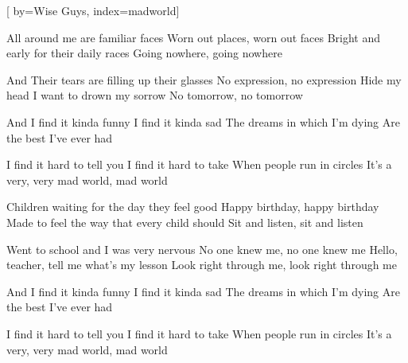 
[%
    by={Wise Guys},
    index={madworld}]


    \label{madworld}

    \beginverse
        All around me are familiar faces
        Worn out places, worn out faces
        Bright and early for their daily races
        Going nowhere, going nowhere

        And Their tears are filling up their glasses
        No expression, no expression
        Hide my head I want to drown my sorrow
        No tomorrow, no tomorrow
    \endverse

    \beginchorus
        And I find it kinda funny
        I find it kinda sad
        The dreams in which I'm dying
        Are the best I've ever had

        I find it hard to tell you
        I find it hard to take
        When people run in circles
        It's a very, very mad world, mad world
    \endchorus

    \beginverse
        Children waiting for the day they feel good
        Happy birthday, happy birthday
        Made to feel the way that every child should
        Sit and listen, sit and listen

        Went to school and I was very nervous
        No one knew me, no one knew me
        Hello, teacher, tell me what's my lesson
        Look right through me, look right through me
    \endverse

    \beginchorus
        And I find it kinda funny
        I find it kinda sad
        The dreams in which I'm dying
        Are the best I've ever had

        I find it hard to tell you
        I find it hard to take
        When people run in circles
        It's a very, very mad world, mad world
    \endchorus
\endsong
